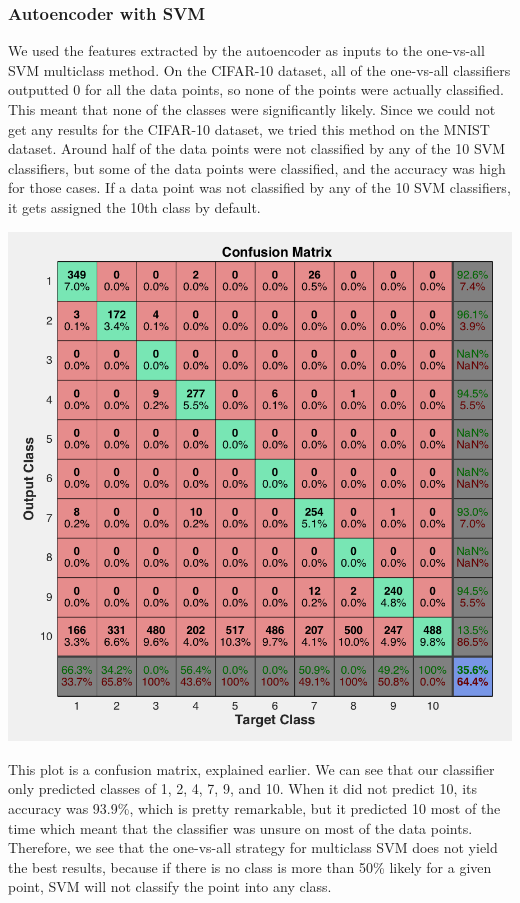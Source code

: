 \documentclass[11pt]{article}
\begin{document}
\subsubsection{Autoencoder with SVM}
We used the features extracted by the autoencoder as inputs to the one-vs-all SVM multiclass method. On the CIFAR-10 dataset, all of the one-vs-all classifiers outputted 0 for all the data points, so none of the points were actually classified. This meant that none of the classes were significantly likely. Since we could not get any results for the CIFAR-10 dataset, we tried this method on the MNIST dataset. Around half of the data points were not classified by any of the 10 SVM classifiers, but some of the data points were classified, and the accuracy was high for those cases. If a data point was not classified by any of the 10 SVM classifiers, it gets assigned the 10th class by default.
\begin{center}
\includegraphics[scale=0.5]{autoencoder_svm_mnist.png}
\end{center}
This plot is a confusion matrix, explained earlier. We can see that our classifier only predicted classes of 1, 2, 4, 7, 9, and 10. When it did not predict 10, its accuracy was 93.9\%, which is pretty remarkable, but it predicted 10 most of the time which meant that the classifier was unsure on most of the data points. Therefore, we see that the one-vs-all strategy for multiclass SVM does not yield the best results, because if there is no class is more than 50\% likely for a given point, SVM will not classify the point into any class.
\end{document}
